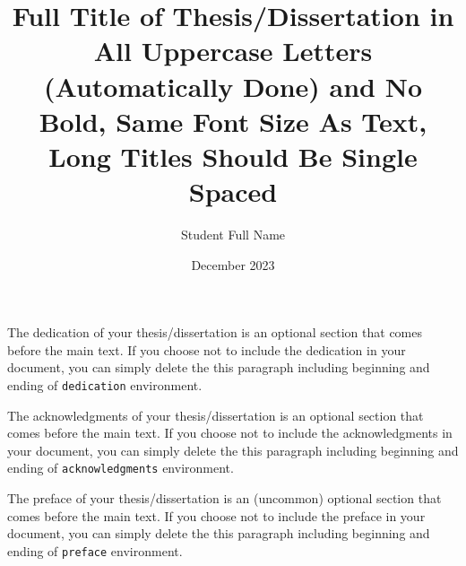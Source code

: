 \documentclass[master,nosecnum,nohyphenation,pdfonly]{uofm}
\title{Full Title of Thesis/Dissertation in All Uppercase Letters (Automatically Done) and No Bold, Same Font Size As Text, Long Titles Should Be Single Spaced}
\author{Student Full Name}
\date{December 2023}
\begin{document}
\maketitle

\frontmatter

\copyrightpage %

\begin{dedication} %
    The dedication of your thesis/dissertation is an optional section that comes before the main text. If you choose not to include the dedication in your document, you can simply delete the this paragraph including beginning and ending of \verb|dedication| environment.
\end{dedication}

\begin{acknowledgments} %
    The acknowledgments of your thesis/dissertation is an optional section that comes before the main text. If you choose not to include the acknowledgments in your document, you can simply delete the this paragraph including beginning and ending of \verb|acknowledgments| environment.
\end{acknowledgments}

\begin{preface} %
    The preface of your thesis/dissertation is an (uncommon) optional section that comes before the main text. If you choose not to include the preface in your document, you can simply delete the this paragraph including beginning and ending of \verb|preface| environment.
\end{preface}
\end{document}
